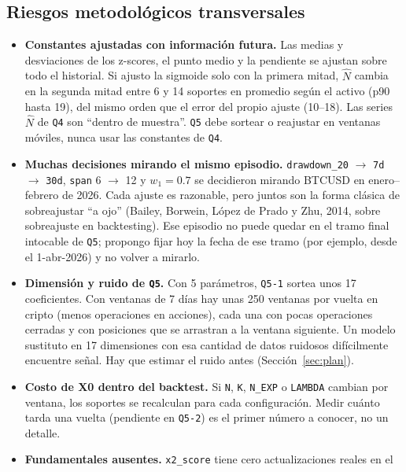 \documentclass[11pt,a4paper]{article}
\newcommand{\code}[1]{\texttt{\small #1}}
\begin{document}
\subsection{Riesgos metodológicos transversales}\label{sec:riesgos}

\begin{itemize}[leftmargin=1.2em]
  \item \textbf{Constantes ajustadas con información futura.} Las medias y desviaciones de los z-scores,
        el punto medio y la pendiente se ajustan sobre todo el historial. Si ajusto la sigmoide solo con
        la primera mitad, $\hat N$ cambia en la segunda mitad entre 6 y 14 soportes en promedio según el
        activo (p90 hasta 19), del mismo orden que el error del propio ajuste (10--18). Las series
        $\hat N$ de \code{Q4} son ``dentro de muestra''. \code{Q5} debe sortear o reajustar en ventanas
        móviles, nunca usar las constantes de \code{Q4}.
  \item \textbf{Muchas decisiones mirando el mismo episodio.} \code{drawdown\_20} $\rightarrow$
        \code{7d} $\rightarrow$ \code{30d}, \code{span} 6 $\rightarrow$ 12 y $w_1=0.7$ se decidieron
        mirando BTCUSD en enero--febrero de 2026. Cada ajuste es razonable, pero juntos son la forma clásica
        de sobreajustar ``a ojo'' (Bailey, Borwein, López de Prado y Zhu, 2014, sobre sobreajuste en
        backtesting). Ese episodio no puede quedar en el tramo final intocable de \code{Q5}; propongo
        fijar hoy la fecha de ese tramo (por ejemplo, desde el 1-abr-2026) y no volver a mirarlo.
  \item \textbf{Dimensión y ruido de \code{Q5}.} Con 5 parámetros, \code{Q5-1} sortea unos 17
        coeficientes. Con ventanas de 7 días hay unas 250 ventanas por vuelta en cripto (menos operaciones
        en acciones), cada una con pocas operaciones cerradas y con posiciones que se arrastran a la
        ventana siguiente. Un modelo sustituto en 17 dimensiones con esa cantidad de datos ruidosos
        difícilmente encuentre señal. Hay que estimar el ruido antes (Sección~\ref{sec:plan}).
  \item \textbf{Costo de X0 dentro del backtest.} Si \code{N}, \code{K}, \code{N\_EXP} o \code{LAMBDA}
        cambian por ventana, los soportes se recalculan para cada configuración. Medir cuánto tarda una
        vuelta (pendiente en \code{Q5-2}) es el primer número a conocer, no un detalle.
  \item \textbf{Fundamentales ausentes.} \code{x2\_score} tiene cero actualizaciones reales en el

\end{itemize}
\end{document}
